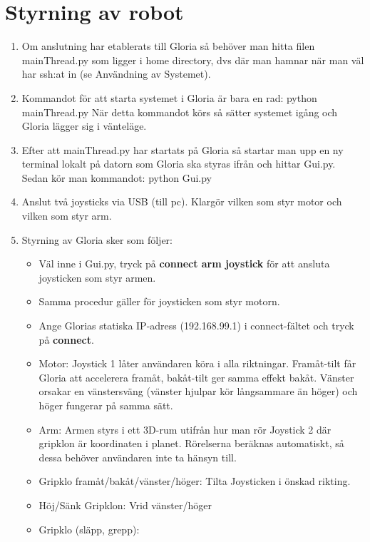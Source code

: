 \section{Styrning av robot}
\begin{enumerate}
	\item Om anslutning har etablerats till Gloria så behöver man hitta filen mainThread.py som ligger i home directory, dvs där man hamnar när man väl har ssh:at in (se Användning av Systemet).
	\item Kommandot för att starta systemet i Gloria är bara en rad: python mainThread.py
	När detta kommandot körs så sätter systemet igång och Gloria lägger sig i vänteläge.
	\item Efter att mainThread.py har startats på Gloria så startar man upp en ny terminal lokalt på datorn som Gloria ska styras ifrån och hittar Gui.py. Sedan kör man kommandot: python Gui.py
	\item Anslut två joysticks via USB (till pc). Klargör vilken som styr motor och vilken som styr arm.
	\item Styrning av Gloria sker som följer: 
	\begin{itemize}
		\item Väl inne i Gui.py, tryck på \textbf{connect arm joystick} för att ansluta joysticken som styr armen.
		\item Samma procedur gäller för joysticken som styr motorn.
		\item Ange Glorias statiska IP-adress (192.168.99.1) i connect-fältet och tryck på \textbf{connect}.
		\item Motor: Joystick 1 låter användaren köra i alla riktningar. Framåt-tilt får Gloria att accelerera framåt, bakåt-tilt ger samma effekt bakåt. Vänster orsakar en vänstersväng (vänster hjulpar kör långsammare än höger) och höger fungerar på samma sätt.
		\item Arm: Armen styrs i ett 3D-rum utifrån hur man rör Joystick 2 där gripklon är koordinaten i planet. Rörelserna beräknas automatiskt, så dessa behöver användaren inte ta hänsyn till. 
		\item Gripklo framåt/bakåt/vänster/höger: Tilta Joysticken i önskad rikting.
		\item Höj/Sänk Gripklon: Vrid vänster/höger
		\item Gripklo (släpp, grepp): %
		

\end{itemize}
\end{enumerate}
